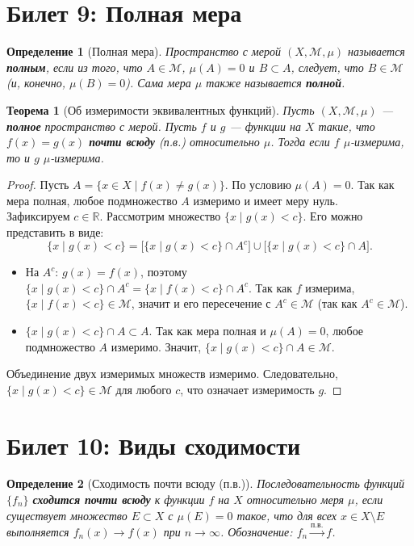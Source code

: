 \documentclass[a4paper, 12pt]{article}
\newtheorem{definition}{Определение}
\newtheorem{theorem}{Теорема}
\newcommand{\R}{\mathbb{R}}
\newcommand{\1}{\mathbf{1}}
\begin{document}
\section*{Билет 9: Полная мера}
\begin{definition}[Полная мера]
    Пространство с мерой $(X, \mathcal{M}, \mu)$ называется \textbf{полным}, если из того, что $A \in \mathcal{M}$, $\mu(A) = 0$ и $B \subset A$, следует, что $B \in \mathcal{M}$ (и, конечно, $\mu(B) = 0$). Сама мера $\mu$ также называется \textbf{полной}.
\end{definition}

\begin{theorem}[Об измеримости эквивалентных функций]
    Пусть $(X, \mathcal{M}, \mu)$ — \textbf{полное} пространство с мерой. Пусть $f$ и $g$ — функции на $X$ такие, что $f(x) = g(x)$ \textbf{почти всюду} (п.в.) относительно $\mu$. Тогда если $f$ $\mu$-измерима, то и $g$ $\mu$-измерима.
\end{theorem}

\begin{proof}
    Пусть $A = \{x \in X \mid f(x) \neq g(x)\}$. По условию $\mu(A) = 0$. Так как мера полная, любое подмножество $A$ измеримо и имеет меру нуль. \\
    Зафиксируем $c \in \R$. Рассмотрим множество $\{x \mid g(x) < c\}$. Его можно представить в виде:
    \[
    \{x \mid g(x) < c\} = \big[ \{x \mid g(x) < c\} \cap A^c \big] \cup \big[ \{x \mid g(x) < c\} \cap A \big].
    \]
    \begin{itemize}
        \item На $A^c$: $g(x) = f(x)$, поэтому $\{x \mid g(x) < c\} \cap A^c = \{x \mid f(x) < c\} \cap A^c$. Так как $f$ измерима, $\{x \mid f(x) < c\} \in \mathcal{M}$, значит и его пересечение с $A^c \in \mathcal{M}$ (так как $A^c \in \mathcal{M}$).
        \item $\{x \mid g(x) < c\} \cap A \subset A$. Так как мера полная и $\mu(A) = 0$, любое подмножество $A$ измеримо. Значит, $\{x \mid g(x) < c\} \cap A \in \mathcal{M}$.
    \end{itemize}
    Объединение двух измеримых множеств измеримо. Следовательно, $\{x \mid g(x) < c\} \in \mathcal{M}$ для любого $c$, что означает измеримость $g$.
\end{proof}

\section*{Билет 10: Виды сходимости}
\begin{definition}[Сходимость почти всюду (п.в.)]
    Последовательность функций $\{f_n\}$ \textbf{сходится почти всюду} к функции $f$ на $X$ относительно меря $\mu$, если существует множество $E \subset X$ с $\mu(E) = 0$ такое, что для всех $x \in X \setminus E$ выполняется $f_n(x) \to f(x)$ при $n \to \infty$. Обозначение: $f_n \xrightarrow{\text{п.в.}} f$.
\end{definition}
\end{document}
